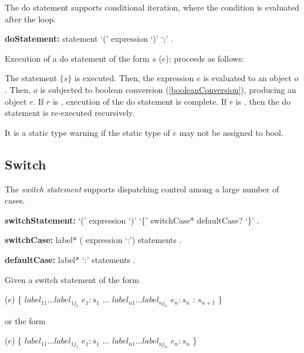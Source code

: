 \documentclass{article}
\newcommand{\code}[1]{{\sf #1}}
\begin{document}
\LMHash{}
The do statement supports conditional iteration, where the condition is evaluated after the loop.

\begin{grammar}
{\bf doStatement:}
    \DO{} statement \WHILE{} `(' expression `)' `{\escapegrammar ;}'%
      .
 \end{grammar}

    
\LMHash{}
Execution of a do statement of the form \code{\DO{} $s$ \WHILE{} ($e$);} proceeds as follows: 

\LMHash{}
The statement $\{s\}$ is executed. Then, the expression $e$ is evaluated to an object $o$. Then, $o$ is  subjected to boolean conversion (\ref{booleanConversion}), producing an object $r$. If $r$ is \FALSE{}, execution of the do statement is complete. If $r$ is \TRUE{}, then the do statement is re-executed recursively. 

\LMHash{}
It is a static type warning if the static type of $e$ may not be assigned to \code{bool}. 

\subsection{Switch}

\LMHash{}
The {\em switch statement} supports dispatching control among a large number of cases.

 \begin{grammar}
{\bf switchStatement:}
      \SWITCH{} `(' expression `)' `\{' switchCase* defaultCase? `\}'%
    .


{\bf switchCase:}
      label* (\CASE{} expression `{\escapegrammar :}') statements
    .

{\bf defaultCase:}
      label*  \DEFAULT{} `{\escapegrammar :}' statements
    .
 \end{grammar}
 
\LMHash{}
 Given a switch statement of the form 
 
\begin{dartCode}
\SWITCH{} ($e$) \{ 
   \CASE{} $label_{11} \ldots label_{1j_1}$ $e_1: s_1$ 
   $\ldots$  
   \CASE{} $label_{n1} \ldots label_{nj_n}$ $e_n: s_n$ 
   \DEFAULT{}: $s_{n+1}$ 
\}
\end{dartCode}
 
 or the form 
 
\begin{dartCode}
\SWITCH{} ($e$) \{ 
   \CASE{} $label_{11} \ldots label_{1j_1}$ $e_1: s_1$
   $\ldots$  
   \CASE{} $label_{n1} \ldots label_{nj_n}$ $e_n: s_n$ 
\}
\end{dartCode}
 
\end{document}
